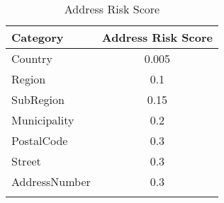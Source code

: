 \begin{wraptable}{r}{0.45\textwidth} %
\centering
\begin{tabular}{lc}
\thickhline
\textbf{Category} & \textbf{Address Risk Score} \\ \hline
Country           & 0.005                       \\
\rowcolor[HTML]{EFEFEF}
Region            & 0.1                         \\
SubRegion         & 0.15                        \\
\rowcolor[HTML]{EFEFEF}
Municipality      & 0.2                         \\
PostalCode        & 0.3                         \\
\rowcolor[HTML]{EFEFEF}
Street            & 0.3                         \\
AddressNumber     & 0.3                         \\
\thickhline
\end{tabular}
\caption{\label{address_risk_score_table}Address Risk Score}
\end{wraptable}


\begin{comment}
\begin{table}[h]
\centering
\begin{tabular}{lc}
\hline
\textbf{Category} & \textbf{Address Risk Score} \\ \hline
Country           & 0.005                       \\
Region            & 0.1                         \\
SubRegion         & 0.15                        \\
Municipality      & 0.2                         \\
PostalCode        & 0.3                         \\
Street            & 0.3                         \\
AddressNumber     & 0.3                         \\
\hline
\end{tabular}
\caption{\label{address_risk_score_table}Address Risk Score Table}
\end{table}
\end{comment}